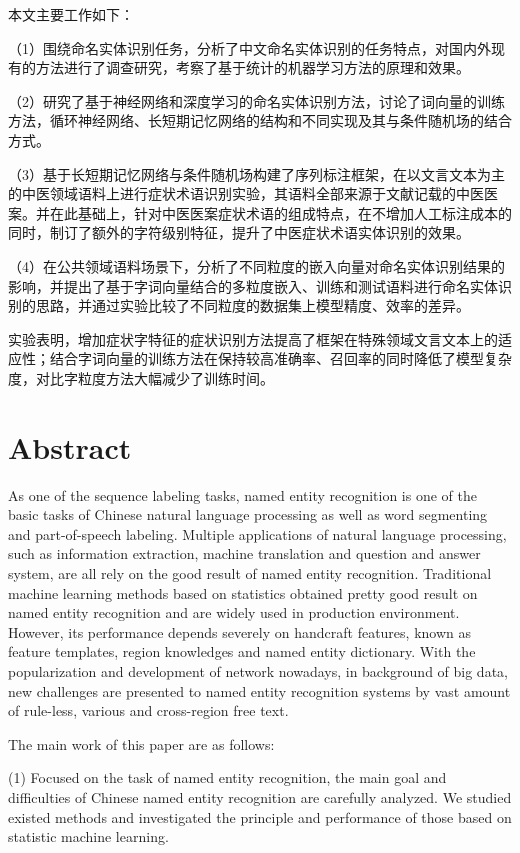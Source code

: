 本文主要工作如下：

（1）围绕命名实体识别任务，分析了中文命名实体识别的任务特点，对国内外现有的方法进行了调查研究，考察了基于统计的机器学习方法的原理和效果。

（2）研究了基于神经网络和深度学习的命名实体识别方法，讨论了词向量的训练方法，循环神经网络、长短期记忆网络的结构和不同实现及其与条件随机场的结合方式。

（3）基于长短期记忆网络与条件随机场构建了序列标注框架，在以文言文本为主的中医领域语料上进行症状术语识别实验，其语料全部来源于文献记载的中医医案。并在此基础上，针对中医医案症状术语的组成特点，在不增加人工标注成本的同时，制订了额外的字符级别特征，提升了中医症状术语实体识别的效果。

（4）在公共领域语料场景下，分析了不同粒度的嵌入向量对命名实体识别结果的影响，并提出了基于字词向量结合的多粒度嵌入、训练和测试语料进行命名实体识别的思路，并通过实验比较了不同粒度的数据集上模型精度、效率的差异。

实验表明，增加症状字特征的症状识别方法提高了框架在特殊领域文言文本上的适应性；结合字词向量的训练方法在保持较高准确率、召回率的同时降低了模型复杂度，对比字粒度方法大幅减少了训练时间。\\
\chapter*{Abstract}%
As one of the sequence labeling tasks, named entity recognition is one of the basic tasks of Chinese natural language processing as well as word segmenting and part-of-speech labeling.
Multiple applications of natural language processing, such as information extraction, machine translation and question and answer system, are all rely on the good result of named entity recognition.
Traditional machine learning methods based on statistics obtained pretty good result on named entity recognition and are widely used in production environment.
However, its performance depends severely on handcraft features, known as feature templates, region knowledges and named entity dictionary.
With the popularization and development of network nowadays, in background of big data, new challenges are presented to named entity recognition systems by vast amount of rule-less, various and cross-region free text.

The main work of this paper are as follows:

(1) Focused on the task of named entity recognition, the main goal and difficulties of Chinese named entity recognition are carefully analyzed. We studied existed methods and investigated the principle and performance of those based on statistic machine learning.

